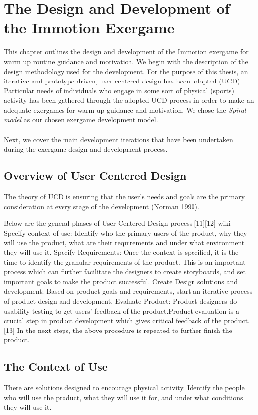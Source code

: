 \chapter{The Design and Development of the Immotion Exergame}\label{chapter:implementation}

This chapter outlines the design and development of the Immotion exergame for warm up routine guidance and motivation. We begin with the description of the design methodology used for the development. For the purpose of this thesis, an iterative and prototype driven, user centered design has been adopted (UCD). Particular needs of individuals who engage in some sort of physical (sports) activity has been gathered through the adopted UCD process in order to make an adequate exergames for warm up guidance and motivation. We chose the \textit{Spiral model} as our chosen exergame development model. \\\\ Next, we cover the main development iterations that have been undertaken during the exergame design and development process. 

\section{Overview of User Centered Design}
The theory of UCD is ensuring that the user's needs and goals are the primary consideration at every stage of the development (Norman 1990).

Below are the general phases of User-Centered Design process:[11][12] wiki
Specify context of use: Identify who the primary users of the product, why they will use the product, what are their requirements and under what environment they will use it.
Specify Requirements: Once the context is specified, it is the time to identify the granular requirements of the product. This is an important process which can further facilitate the designers to create storyboards, and set important goals to make the product successful.
Create Design solutions and development: Based on product goals and requirements, start an iterative process of product design and development.
Evaluate Product: Product designers do usability testing to get users' feedback of the product.Product evaluation is a crucial step in product development which gives critical feedback of the product.[13]
In the next steps, the above procedure is repeated to further finish the product. 

\section{The Context of Use}
There are solutions designed to encourage physical activity.
Identify the people who will use the product, what they will use it for, and under what conditions they will use it.
